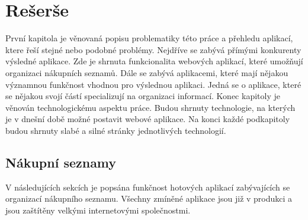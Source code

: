 
%

\chapter{Rešerše}
První kapitola je věnovaná popisu problematiky této práce a přehledu aplikací, ktere řeší stejné nebo podobné problémy.
Nejdříve se zabývá přímými konkurenty výsledné aplikace. Zde je shrnuta funkcionalita webových aplikací, které umožňují organizaci nákupních seznamů.
Dále se zabývá aplikacemi, které mají nějakou významnou funkčnost vhodnou pro výslednou aplikaci. Jedná se o aplikace, které se nějakou svojí částí specializují na organizaci informací. Konec kapitoly je věnován technologickému aspektu práce. Budou shrnuty technologie, na kterých je v dnešní době možné postavit webové aplikace.
Na konci každé podkapitoly budou shrnuty slabé a silné stránky jednotlivých technologií.

\section{Nákupní seznamy}
\label{sec:nakupni-seznamy}
V následujících sekcích je popsána funkčnost hotových aplikací zabývajících se organizací nákupního seznamu. Všechny zmíněné aplikace jsou již v produkci a jsou zaštítěny velkými internetovými společnostmi.

